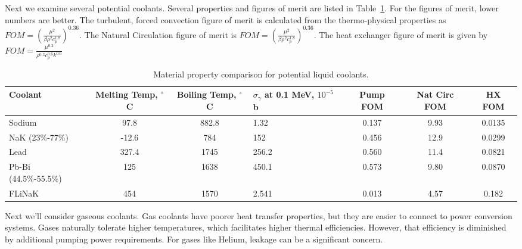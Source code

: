 \documentclass[]{report}
\begin{document}
Next we examine several potential coolants. Several properties and figures of merit are listed in Table~\ref{tab:coolant_properties}. For the figures of merit, lower numbers are better. The turbulent, forced convection figure of merit is calculated from the thermo-physical properties as $FOM=\left(\frac{\mu^2}{\beta\rho^2c_p^{1.8} } \right)^{0.36}$. The Natural Circulation figure of merit is $FOM= \left( \frac{\mu^2}{\beta\rho^2c_p^{1.8}}  \right)^{0.36}$. The heat exchanger figure of merit is given by $FOM= \frac{\mu^{0.2}}{\rho^{0.3}c_p^{0.6}k^{0.6}}$

\begin{table} \label{tab:coolant_properties}
\hspace*{-2cm} %
\begin{tabular}{|l|c|c|p{2.5cm}|c|c|c|}
%
%
\hline
Coolant & Melting Temp, $^{\circ}$C & Boiling Temp, $^{\circ}$C & $\sigma_\gamma $ at 0.1 MeV, $10^{-5}$ b & Pump FOM & Nat Circ FOM & HX FOM \\
\hline
Sodium & 97.8 & 882.8 & 1.32 & 0.137 & 9.93 & 0.0135 \\
\hline
NaK (23\%-77\%) & -12.6 & 784 & 152 & 0.456 & 12.9 & 0.0299\\
\hline
Lead & 327.4 & 1745 & 256.2 & 0.560 & 11.4 & 0.0821\\
\hline
Pb-Bi (44.5\%-55.5\%) & 125 & 1638 & 450.1 & 0.573 & 9.80 & 0.0870\\
\hline
FLiNaK & 454 & 1570 & 2.541 & 0.013 & 4.57 & 0.182\\
\hline
\end{tabular}
\caption{Material property comparison for potential liquid coolants.\cite{IAEA_1}}
\end{table}

Next we'll consider gaseous coolants. Gas coolants have poorer heat transfer properties, but they are easier to connect to power conversion systems. Gases naturally tolerate higher temperatures, which facilitates higher thermal efficiencies. However, that efficiency is diminished by additional pumping power requirements.
For gases like Helium, leakage can be a significant concern. 
\end{document}
